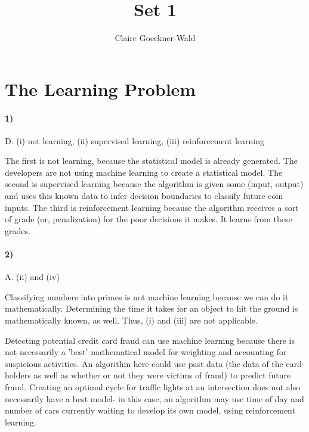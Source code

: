 \documentclass[10pt,letter]{article}
\begin{document}
\title{Set 1}
\author{Claire Goeckner-Wald}
\maketitle 

\section*{The Learning Problem}

\paragraph{1)} D. (i) not learning, (ii) supervised learning, (iii) reinforcement learning

	The first is not learning, because the statistical model is already generated. The developers are not using machine learning to create a statistical model. The second is supervised learning because the algorithm is given some (input, output) and uses this known data to infer decision boundaries to classify future coin inputs. The third is reinforcement learning because the algorithm receives a sort of grade (or, penalization) for the poor decisions it makes. It learns from these grades.

\paragraph{2)} A. (ii) and (iv)

	Classifying numbers into primes is not machine learning because we can do it mathematically. Determining the time it takes for an object to hit the ground is mathematically known, as well. Thus, (i) and (iii) are not applicable.

	Detecting potential credit card fraud can use machine learning because there is not necessarily a 'best' mathematical model for weighting and accounting for suspicious activities. An algorithm here could use past data (the data of the card-holders as well as whether or not they were victims of fraud) to predict future fraud. Creating an optimal cycle for traffic lights at an intersection does not also necessarily have a best model- in this case, an algorithm may use time of day and number of cars currently waiting to develop its own model, using reinforcement learning.

\end{document}
